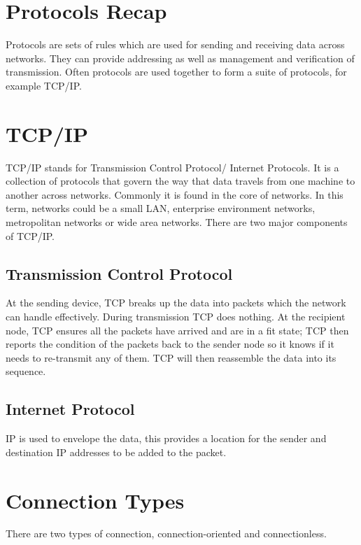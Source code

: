 \section*{Protocols Recap}
Protocols are sets of rules which are used for sending and receiving data across networks. They can provide addressing as well as management and verification of transmission. Often protocols are used together to form a suite of protocols, for example TCP/IP.

\section*{TCP/IP}
TCP/IP stands for Transmission Control Protocol/ Internet Protocols. It is a collection of protocols that govern the way that data travels from one machine to another across networks. Commonly it is found in the core of networks. In this term, networks could be a small LAN, enterprise environment networks, metropolitan networks or wide area networks. There are two major components of TCP/IP.
\subsection*{Transmission Control Protocol}
At the sending device, TCP breaks up the data into packets which the network can handle effectively. During transmission TCP does nothing. At the recipient node, TCP ensures all the packets have arrived and are in a fit state; TCP then reports the condition of the packets back to the sender node so it knows if it needs to re-transmit any of them. TCP will then reassemble the data into its sequence.
\subsection*{Internet Protocol}
IP is used to envelope the data, this provides a location for the sender and destination IP addresses to be added to the packet.

\section*{Connection Types}
There are two types of connection, connection-oriented and connectionless.
